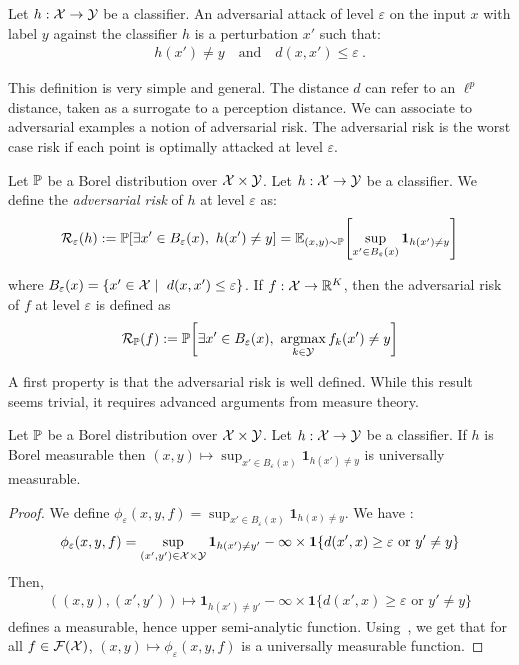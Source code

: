 \begin{definition} 
    Let $h:\mathcal{X}\to\mathcal{Y}$ be a classifier. An adversarial attack of level $\varepsilon$ on the input $x$ with label $y$ against the classifier $h$ is a perturbation $x'$ such that:
    \begin{align*}
        h(x')\neq y\quad\text{and}\quad d(x,x')\leq\varepsilon~.
    \end{align*}
\end{definition}
This definition is very simple and general. The distance $d$ can refer to an $\ell^p$ distance, taken as a surrogate to a perception distance. We can associate to adversarial examples a notion of adversarial risk. The adversarial risk is the worst case risk if each point is optimally attacked at level $\varepsilon$.
\begin{definition}
  Let $\mathbb{P}$ be a Borel distribution over $\mathcal{X} \times \mathcal{Y}$. Let $h:\mathcal{X}\to\mathcal{Y}$ be a classifier. We define the \emph{adversarial risk} of $h$ at level $\varepsilon$ as:
  \begin{align*}
    \risk_\varepsilon(h):=\PP\left[\exists x'\in B_\varepsilon(x),~h(x')\neq y\right] = \mathbb{E}_{(x,y)\sim\PP}\left[\sup_{x'\in B_\varepsilon(x)}\mathbf{1}_{h(x')\neq y}\right]
  \end{align*}

  where $B_\varepsilon(x) = \{x'\in\mathcal{X}\mid~d(x,x')\leq\varepsilon\}$. If $f:\mathcal{X}\to\mathbb{R}^K$, then the adversarial risk of $f$ at level $\varepsilon$ is defined as
   \begin{align*}
    \risk_{\PP}(f):=\PP\left[\exists x'\in B_\varepsilon(x),~\argmaxB_{k\in\YY}f_k(x')\neq y\right]
   \end{align*}
\end{definition}
A first property is that the adversarial risk is well defined. While this result seems trivial, it requires advanced arguments from measure theory. 
\begin{prop}
  Let $\mathbb{P}$ be a Borel distribution over $\mathcal{X} \times \mathcal{Y}$. Let $h:\mathcal{X}\to\mathcal{Y}$ be a classifier. If $h$ is Borel measurable then $(x,y)\mapsto \sup_{x'\in B_\varepsilon(x)}\mathbf{1}_{h(x')\neq y}$ is universally measurable.
\end{prop}
\begin{proof}
  We define $\phi_\varepsilon(x,y,f) = \sup_{x'\in B_\varepsilon(x)}\mathbf{1}_{h(x)\neq y}$.  We have :
  \begin{align*}
     \phi_\varepsilon(x,y,f) =  \sup_{(x',y')\in\mathcal{X}\times\mathcal{Y}}\mathbf{1}_{h(x')\neq y'}-\infty\times \mathbf{1}\{d(x',x)\geq \varepsilon\text{ or }y'\neq y\}
  \end{align*}
  Then,
  \begin{align*}
      \left((x,y),(x',y')\right)\mapsto\mathbf{1}_{h(x')\neq y'}-\infty\times \mathbf{1}\{d(x',x)\geq \varepsilon\text{ or }y'\neq y\}
  \end{align*}
  defines a measurable, hence upper semi-analytic function. Using~\citep[Proposition 7.39, Corollary 7.42]{bertsekas2004stochastic}, we get that for all $f\in\mathcal{F}(\mathcal{X})$, $(x,y)\mapsto\phi_\varepsilon(x,y,f)$ is a universally measurable function.
\end{proof}

